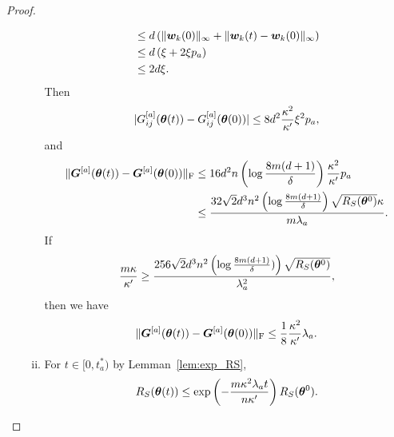 \documentclass{article}
\begin{document}
\begin{proof}
\begin{enumerate}[(a)]
\begin{enumerate}[(i)]
\begin{equation}
\begin{aligned}
                                 & \leq d\left(\lVert\bm{w}_k(0)\rVert_{\infty} + \lVert\bm{w}_k(t) - \bm{w}_k(0)\rVert_{\infty}\right) \\
                                 & \leq d\left(\xi+2\xi p_a\right)                         \\
                                 & \leq 2d\xi.
                            \end{aligned}
                        \end{equation}
                        Then
                        \begin{equation}
                            \lvert G_{ij}^{[a]}(\bm{\theta}(t)) - G_{ij}^{[a]}(\bm{\theta}(0))\rvert \leq 8d^2\frac{\kappa^2}{\kappa'}\xi^2p_a,
                        \end{equation}
                        and
                        \begin{equation}
                            \begin{aligned}
                                \lVert\bm{G}^{[a]}(\bm{\theta}(t)) - \bm{G}^{[a]}(\bm{\theta}(0))\rVert_\mathrm{F}
                                 & \leq 16d^2n\left(\log\frac{8m(d+1)}{\delta}\right)\frac{\kappa^2}{\kappa'}p_a                          \\
                                 & \leq\frac{32\sqrt{2}d^3n^2\left(\log\frac{8m(d+1)}{\delta}\right)\sqrt{R_S(\bm{\theta}^0)}\kappa}{m\lambda_a}.
                            \end{aligned}
                        \end{equation}
                        If
                        \begin{equation}
                            \frac{m\kappa}{\kappa'}\geq\frac{256\sqrt{2}d^3n^2\left(\log\frac{8m(d+1)}{\delta})\right)\sqrt{R_S(\bm{\theta}^0)}}{\lambda_a^2},
                        \end{equation}
                        then we have
                        \begin{equation}\label{thm-proof:w-step1}
                            \lVert\bm{G}^{[a]}(\bm{\theta}(t)) - \bm{G}^{[a]}(\bm{\theta}(0))\rVert_\mathrm{F}\leq\frac{1}{8}\frac{\kappa^2}{\kappa'}\lambda_a.
                        \end{equation}
                  \item For $t\in[0,t^*_a)$ by Lemman~\ref{lem:exp_RS},
                        \begin{equation}
                            \RS(\vtheta(t))\leq\exp\left(-\frac{m\kappa^2\lambda_at}{n\kappa'}\right)\RS(\vtheta^0).

\end{equation}
\end{enumerate}
\end{enumerate}
\end{proof}
\end{document}
